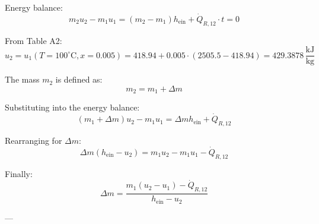 Energy balance:  
\[
m_2 u_2 - m_1 u_1 = (m_2 - m_1) h_{\text{ein}} + \dot{Q}_{R,12} \cdot t = 0
\]

From Table A2:  
\[
u_2 = u_1 (T = 100^\circ\text{C}, x = 0.005) = 418.94 + 0.005 \cdot (2505.5 - 418.94) = 429.3878 \, \frac{\text{kJ}}{\text{kg}}
\]

The mass \( m_2 \) is defined as:  
\[
m_2 = m_1 + \Delta m
\]

Substituting into the energy balance:  
\[
(m_1 + \Delta m) u_2 - m_1 u_1 = \Delta m h_{\text{ein}} + \dot{Q}_{R,12}
\]

Rearranging for \( \Delta m \):  
\[
\Delta m (h_{\text{ein}} - u_2) = m_1 u_2 - m_1 u_1 - \dot{Q}_{R,12}
\]

Finally:  
\[
\Delta m = \frac{m_1 (u_2 - u_1) - \dot{Q}_{R,12}}{h_{\text{ein}} - u_2}
\]

---